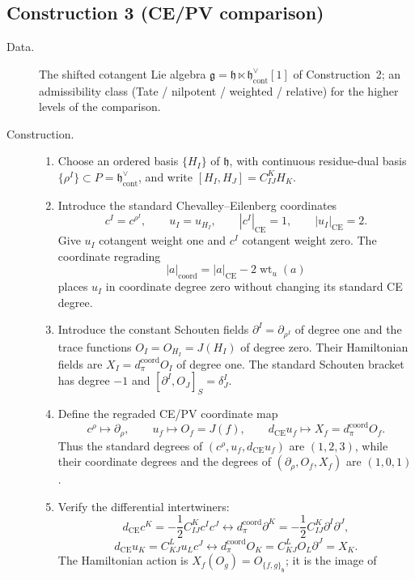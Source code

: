 
\subsection*{Construction 3 (CE/PV comparison)}\label{algo:CEPV}

\begin{description}
\item[Data.]  The shifted cotangent Lie algebra
\(\mathfrak g=\mathfrak h\ltimes\mathfrak h^\vee_{\mathrm{cont}}[1]\)
of Construction~2; an admissibility class (Tate / nilpotent / weighted /
relative) for the higher levels of the comparison.
\item[Construction.]
\begin{enumerate}
\item Choose an ordered basis \(\{H_I\}\) of \(\mathfrak h\), with
continuous residue-dual basis \(\{\rho^I\}\subset
P=\mathfrak h^\vee_{\mathrm{cont}}\), and write
\([H_I,H_J]=C^K_{IJ}H_K\).
\item Introduce the standard Chevalley--Eilenberg coordinates
\[
  c^I=c^{\rho^I},\qquad u_I=u_{H_I},
  \qquad
  |c^I|_{\mathrm{CE}}=1,\qquad |u_I|_{\mathrm{CE}}=2.
\]
Give \(u_I\) cotangent weight one and \(c^I\) cotangent weight zero.
The coordinate regrading
\[
  |a|_{\mathrm{coord}}
  =|a|_{\mathrm{CE}}-2\operatorname{wt}_u(a)
\]
places \(u_I\) in coordinate degree zero without changing its standard
CE degree.
\item Introduce the constant Schouten fields
\(\partial^I=\partial_{\rho^I}\) of degree one and the trace functions
\(O_I=O_{H_I}=J(H_I)\) of degree zero.  Their Hamiltonian fields are
\(X_I=d_{\pi}^{\mathrm{coord}}O_I\) of degree one.  The standard
Schouten bracket has degree \(-1\) and
\([\partial^I,O_J]_S=\delta^I_J\).
\item Define the regraded CE/PV coordinate map
\[
  c^\rho\longmapsto\partial_\rho,\qquad
  u_f\longmapsto O_f=J(f),\qquad
  d_{\mathrm{CE}}u_f\longmapsto
  X_f=d_{\pi}^{\mathrm{coord}}O_f.
\]
Thus the standard degrees of \((c^\rho,u_f,d_{\mathrm{CE}}u_f)\) are
\((1,2,3)\), while their coordinate degrees and the degrees of
\((\partial_\rho,O_f,X_f)\) are \((1,0,1)\).
\item Verify the differential intertwiners:
\[
  d_{\mathrm{CE}}c^K=-\frac12 C^K_{IJ}c^Ic^J
  \longleftrightarrow
  d_{\pi}^{\mathrm{coord}}\partial^K
  =-\frac12 C^K_{IJ}\partial^I\partial^J,
\]
\[
  d_{\mathrm{CE}}u_K=C^L_{KJ}u_Lc^J
  \longleftrightarrow
  d_{\pi}^{\mathrm{coord}}O_K=C^L_{KJ}O_L\partial^J=X_K.
\]
The Hamiltonian action is
\(X_f(O_g)=O_{\{f,g\}_{\mathfrak h}}\); it is the image of

\end{enumerate}
\end{description}
